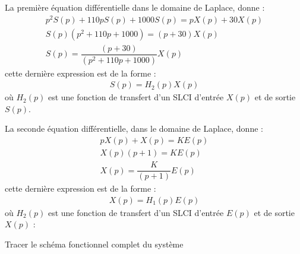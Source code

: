 
\question{}
La première équation différentielle dans le domaine de Laplace, donne : 
\begin{align*}
p^2S(p)+110pS(p)+1000S(p)=pX(p)+30X(p) \\
S(p) ( p^2+110p+1000) = (p+30)X(p) \\
S(p) = \dfrac{(p+30)}{(p^2+110p+1000)} X(p) 
\end{align*}
cette dernière expression est de la forme :
\begin{align}
S(p) = H_2(p) X(p)
\label{eq-h2}
\end{align}
où $H_2(p)$ est une fonction de transfert d'un SLCI d'entrée $X(p)$ 
et de sortie $S(p)$.
\begin{center}
\end{center}

La seconde équation différentielle, dans le domaine de Laplace, donne : 
\begin{align*}
    pX(p)+X(p)=KE(p) \\
    X(p) (p+1) = KE(p) \\
    X(p) = \dfrac{K}{(p+1)} E(p) 
\end{align*}
cette dernière expression est de la forme :
\begin{align}
X(p) = H_1(p) E(p)
\label{eq-h1}
\end{align}
où $H_2(p)$ est une fonction de transfert d'un SLCI d'entrée $E(p)$ 
et de sortie $X(p)$ :
\begin{center}
\end{center}

\question{}
Tracer le schéma fonctionnel complet du système
\begin{center}
\end{center}

